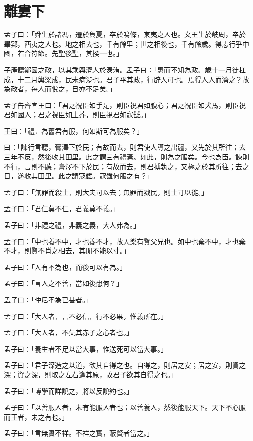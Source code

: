 \documentclass[12pt,a4paper]{ctexbook}
\begin{document}
\section{離婁下}
孟子曰：「舜生於諸馮，遷於負夏，卒於鳴條，東夷之人也。文王生於岐周，卒於畢郢，西夷之人也。地之相去也，千有餘里；世之相後也，千有餘歲。得志行乎中國，若合符節。先聖後聖，其揆一也。」\par
子產聽鄭國之政，以其乘輿濟人於溱洧。孟子曰：「惠而不知為政。歲十一月徒杠成，十二月輿梁成，民未病涉也。君子平其政，行辟人可也。焉得人人而濟之？故為政者，每人而悅之，日亦不足矣。」\par
孟子告齊宣王曰：「君之視臣如手足，則臣視君如腹心；君之視臣如犬馬，則臣視君如國人；君之視臣如土芥，則臣視君如寇讎。」\par
王曰：「禮，為舊君有服，何如斯可為服矣？」\par
曰：「諫行言聽，膏澤下於民；有故而去，則君使人導之出疆，又先於其所往；去三年不反，然後收其田里。此之謂三有禮焉。如此，則為之服矣。今也為臣。諫則不行，言則不聽；膏澤不下於民；有故而去，則君搏執之，又極之於其所往；去之日，遂收其田里。此之謂寇讎。寇讎何服之有？」\par
孟子曰：「無罪而殺士，則大夫可以去；無罪而戮民，則士可以徙。」\par
孟子曰：「君仁莫不仁，君義莫不義。」\par
孟子曰：「非禮之禮，非義之義，大人弗為。」\par
孟子曰：「中也養不中，才也養不才，故人樂有賢父兄也。如中也棄不中，才也棄不才，則賢不肖之相去，其閒不能以寸。」\par
孟子曰：「人有不為也，而後可以有為。」\par
孟子曰：「言人之不善，當如後患何？」\par
孟子曰：「仲尼不為已甚者。」\par
孟子曰：「大人者，言不必信，行不必果，惟義所在。」\par
孟子曰：「大人者，不失其赤子之心者也。」\par
孟子曰：「養生者不足以當大事，惟送死可以當大事。」\par
孟子曰：「君子深造之以道，欲其自得之也。自得之，則居之安；居之安，則資之深；資之深，則取之左右逢其原，故君子欲其自得之也。」\par
孟子曰：「博學而詳說之，將以反說約也。」\par
孟子曰：「以善服人者，未有能服人者也；以善養人，然後能服天下。天下不心服而王者，未之有也。」\par
孟子曰：「言無實不祥。不祥之實，蔽賢者當之。」\par
\end{document}
